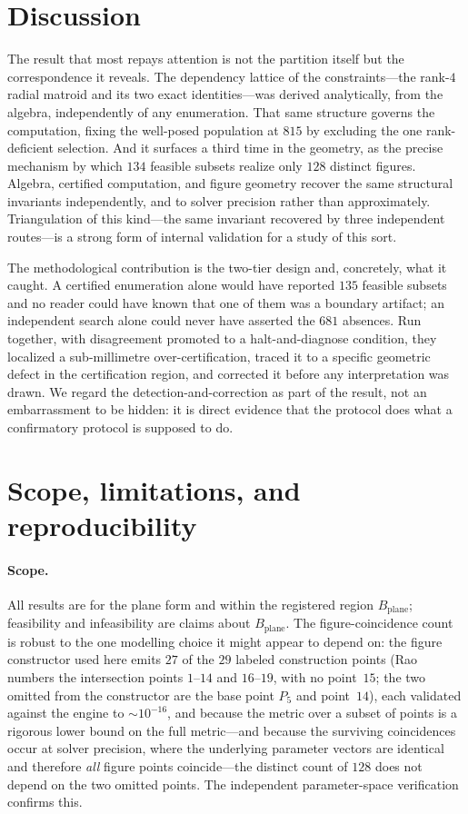 \documentclass[11pt]{article}
\newcommand{\Bplane}{B_{\mathrm{plane}}}
\begin{document}
\section{Discussion}

The result that most repays attention is not the partition itself but the correspondence it reveals. The dependency lattice of the constraints---the rank-$4$ radial matroid and its two exact identities---was derived analytically, from the algebra, independently of any enumeration. That same structure governs the computation, fixing the well-posed population at $815$ by excluding the one rank-deficient selection. And it surfaces a third time in the geometry, as the precise mechanism by which $134$ feasible subsets realize only $128$ distinct figures. Algebra, certified computation, and figure geometry recover the same structural invariants independently, and to solver precision rather than approximately. Triangulation of this kind---the same invariant recovered by three independent routes---is a strong form of internal validation for a study of this sort.

The methodological contribution is the two-tier design and, concretely, what it caught. A certified enumeration alone would have reported $135$ feasible subsets and no reader could have known that one of them was a boundary artifact; an independent search alone could never have asserted the $681$ absences. Run together, with disagreement promoted to a halt-and-diagnose condition, they localized a sub-millimetre over-certification, traced it to a specific geometric defect in the certification region, and corrected it before any interpretation was drawn. We regard the detection-and-correction as part of the result, not an embarrassment to be hidden: it is direct evidence that the protocol does what a confirmatory protocol is supposed to do.

\section{Scope, limitations, and reproducibility}
\label{sec:scope}

\paragraph{Scope.}
All results are for the plane form and within the registered region $\Bplane$; feasibility and infeasibility are claims about $\Bplane$. The figure-coincidence count is robust to the one modelling choice it might appear to depend on: the figure constructor used here emits $27$ of the $29$ labeled construction points (Rao numbers the intersection points $1$--$14$ and $16$--$19$, with no point~$15$; the two omitted from the constructor are the base point $P_5$ and point~$14$), each validated against the engine to $\sim\!10^{-16}$, and because the metric over a subset of points is a rigorous lower bound on the full metric---and because the surviving coincidences occur at solver precision, where the underlying parameter vectors are identical and therefore \emph{all} figure points coincide---the distinct count of $128$ does not depend on the two omitted points. The independent parameter-space verification confirms this.
\end{document}

